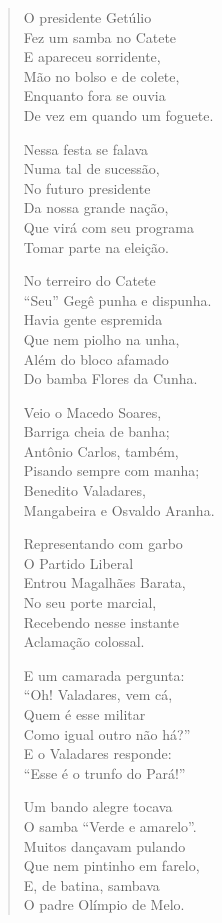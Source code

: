 \begin{verse}
O presidente Getúlio\\
Fez um samba no Catete\\
E apareceu sorridente,\\
Mão no bolso e de colete,\\
Enquanto fora se ouvia\\
De vez em quando um foguete.

Nessa festa se falava\\
Numa tal de sucessão,\\
No futuro presidente\\
Da nossa grande nação,\\
Que virá com seu programa\\
Tomar parte na eleição.

No terreiro do Catete\\
“Seu” Gegê punha e dispunha.\\
Havia gente espremida\\
Que nem piolho na unha,\\
Além do bloco afamado\\
Do bamba Flores da Cunha.


Veio o Macedo Soares,\\
Barriga cheia de banha;\\
Antônio Carlos, também,\\
Pisando sempre com manha;\\
Benedito Valadares,\\
Mangabeira e Osvaldo Aranha.

Representando com garbo\\
O Partido Liberal\\
Entrou Magalhães Barata,\\
No seu porte marcial,\\
Recebendo nesse instante\\
Aclamação colossal.

E um camarada pergunta:\\
“Oh! Valadares, vem cá,\\
Quem é esse militar\\
Como igual outro não há?”\\
E o Valadares responde:\\
“Esse é o trunfo do Pará!”

Um bando alegre tocava\\
O samba “Verde e amarelo”.\\
Muitos dançavam pulando\\
Que nem pintinho em farelo,\\
E, de batina, sambava\\
O padre Olímpio de Melo.



\end{verse}
